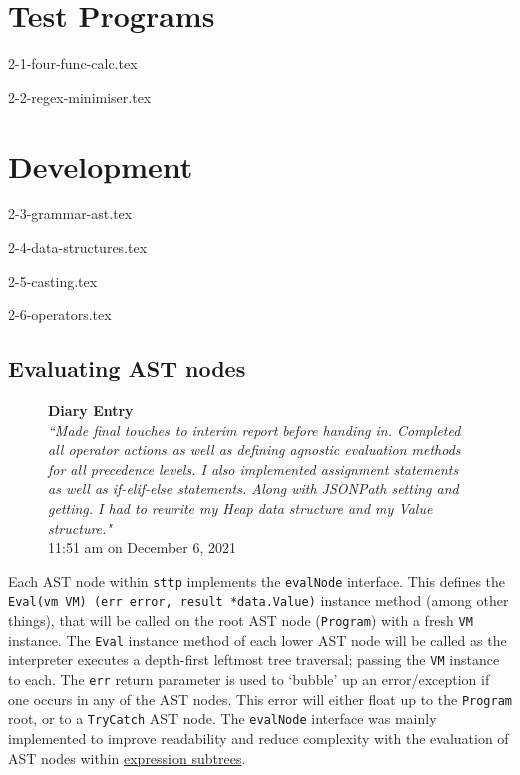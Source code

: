 \documentclass[]{full}
\theoremstyle{definition}
\begin{document}
\chapter{Test Programs}
\label{chap:test-programs}

{2-1-four-func-calc.tex}

{2-2-regex-minimiser.tex}

\chapter{Development}
\label{chap:development}

{2-3-grammar-ast.tex}

{2-4-data-structures.tex}

{2-5-casting.tex}

{2-6-operators.tex}

\section{Evaluating AST nodes}

\begin{figure}[H]
    \begin{center}
        \textbf{Diary Entry}\\[0.5em]
        \textit{``Made final touches to interim report before handing in. Completed all operator actions as well as defining agnostic evaluation methods for all precedence levels. I also implemented assignment statements as well as if-elif-else statements. Along with JSONPath setting and getting. I had to rewrite my Heap data structure and my Value structure."}\\[0.5em]
        \tiny{11:51 am on December 6, 2021}
    \end{center}
\end{figure}
    
Each AST node within \verb|sttp| implements the \verb|evalNode| interface. This defines the \texttt{Eval(vm VM) (err error, result *data.Value)} instance method (among other things), that will be called on the root AST node (\verb|Program|) with a fresh \verb|VM| instance. The \verb|Eval| instance method of each lower AST node will be called as the interpreter executes a depth-first leftmost tree traversal; passing the \verb|VM| instance to each. The \verb|err| return parameter is used to `bubble' up an error/exception if one occurs in any of the AST nodes. This error will either float up to the \verb|Program| root, or to a \verb|TryCatch| AST node. The \verb|evalNode| interface was mainly implemented to improve readability and reduce complexity with the evaluation of AST nodes within \hyperref[sec:development-ast-nodes-expressions]{expression subtrees}.
\end{document}
